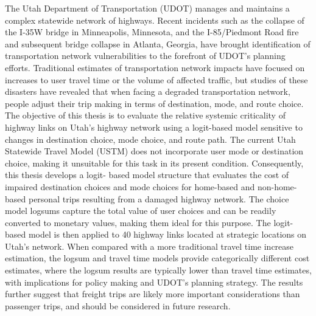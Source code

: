 \afterpage{\cleardoublepage}


The Utah Department of Transportation (UDOT) manages and maintains a complex statewide network of highways. Recent incidents such as the collapse of the I-35W bridge in Minneapolis, Minnesota, and the I-85/Piedmont Road fire and subsequent bridge collapse in Atlanta, Georgia, have brought identification of transportation network vulnerabilities to the forefront of UDOT’s planning efforts. Traditional estimates of transportation network impacts have focused on increases to user travel time or the volume of affected traffic, but studies of these disasters have revealed that when facing a degraded transportation network, people adjust their trip making in terms of destination, mode, and route choice. The objective of this thesis is to evaluate the relative systemic criticality of highway links on Utah’s highway network using a logit-based model sensitive to changes in destination choice, mode choice, and route path. The current Utah Statewide Travel Model (USTM) does not incorporate user mode or destination choice, making it unsuitable for this task in its present condition. Consequently, this thesis develops a logit- based model structure that evaluates the cost of impaired destination choices and mode choices for home-based and non-home-based personal trips resulting from a damaged highway network. The choice model logsums capture the total value of user choices and can be readily converted to monetary values, making them ideal for this purpose. The logit-based model is then applied to 40 highway links located at strategic locations on Utah’s network. When compared with a more traditional travel time increase estimation, the logsum and travel time models provide categorically different cost estimates, where the logsum results are typically lower than travel time estimates, with implications for policy making and UDOT’s planning strategy. The results further suggest that freight trips are likely more important considerations than passenger trips, and should be considered in future research.
